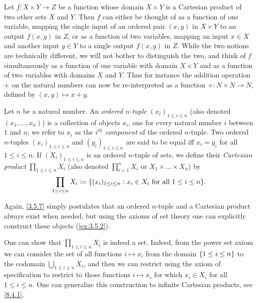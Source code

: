 \begin{note}
	Let \(f : X \times Y \to Z\) be a function whose domain \(X \times Y\) is a Cartesian product of two other sets \(X\) and \(Y\).
	Then \(f\) can either be thought of as a function of one variable, mapping the single input of an ordered pair \((x, y)\) in \(X \times Y\) to an output \(f(x, y)\) in \(Z\), or as a function of two variables, mapping an input \(x \in X\) and another input \(y \in Y\) to a single output \(f(x, y)\) in \(Z\).
	While the two notions are technically different, we will not bother to distinguish the two, and think of \(f\) simultaneously as a function of one variable with domain \(X \times Y\) and as a function of two variables with domains \(X\) and \(Y\).
	Thus for instance the addition operation \(+\) on the natural numbers can now be re-interpreted as a function \(+ : N \times N \to N\), defined by \((x, y) \mapsto x + y\).
\end{note}

\setcounter{thm}{6}
\begin{defn}\label{3.5.7}
	Let \(n\) be a natural number.
	An \emph{ordered \(n\)-tuple} \((x_i)_{1 \leq i \leq n}\) (also denoted \((x_1, \dots, x_n)\)) is a collection of objects \(x_i\), one for every natural number \(i\) between \(1\) and \(n\);
	we refer to \(x_i\) as the \emph{\(i^{th}\) component} of the ordered \(n\)-tuple.
	Two ordered \(n\)-tuples \((x_i)_{1 \leq i \leq n}\) and \((y_i)_{1 \leq i \leq n}\) are said to be equal iff \(x_i = y_i\) for all \(1 \leq i \leq n\).
	If \((X_i)_{1 \leq i \leq n}\) is an ordered \(n\)-tuple of sets, we define their \emph{Cartesian product} \(\prod_{1 \leq i \leq n} X_i\) (also denoted \(\prod_{i=1}^n X_i\) or \(X_1 \times \dots \times X_n\)) by
	\[
		\prod_{1 \leq i \leq n} X_i \coloneqq \set{(x_i)_{1 \leq i \leq n} : x_i \in X_i \text{ for all } 1 \leq i \leq n}.
	\]
\end{defn}

\begin{note}
	Again, \cref{3.5.7} simply postulates that an ordered \(n\)-tuple and a Cartesian product always exist when needed, but using the axioms of set theory one can explicitly construct these objects (\cref{ex:3.5.2}).
\end{note}

\begin{rmk}\label{3.5.8}
	One can show that \(\prod_{1 \leq i \leq n} X_i\) is indeed a set.
	Indeed, from the power set axiom we can consider the set of all functions \(i \mapsto x_i\) from the domain \(\left\lbrace1 \leq i \leq n\right\rbrace\) to the codomain \(\bigcup_{1 \leq i \leq n} X_i\), and then we can restrict using the axiom of specification to restrict to those functions \(i \mapsto x_i\) for which \(x_i \in X_i\) for all \(1 \leq i \leq n\).
	One can generalize this construction to infinite Cartesian products, see \cref{8.4.1}.
\end{rmk}

